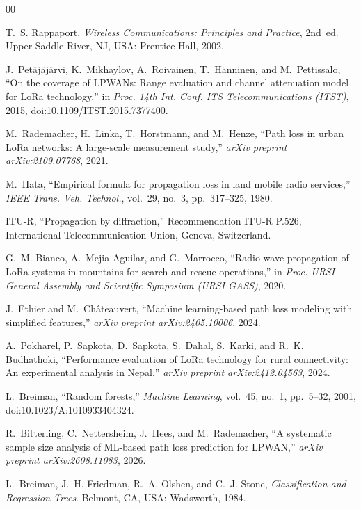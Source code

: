 \documentclass[conference]{IEEEtran}
\begin{document}
\begin{thebibliography}{00}

T.~S. Rappaport, \emph{Wireless Communications: Principles and Practice}, 2nd~ed. Upper Saddle River, NJ, USA: Prentice Hall, 2002.

J.~Petäjäjärvi, K.~Mikhaylov, A.~Roivainen, T.~Hänninen, and M.~Pettissalo, ``On the coverage of LPWANs: Range evaluation and channel attenuation model for LoRa technology,'' in \emph{Proc. 14th Int. Conf. ITS Telecommunications (ITST)}, 2015, doi:10.1109/ITST.2015.7377400.

M.~Rademacher, H.~Linka, T.~Horstmann, and M.~Henze, ``Path loss in urban LoRa networks: A large-scale measurement study,'' \emph{arXiv preprint arXiv:2109.07768}, 2021.

M.~Hata, ``Empirical formula for propagation loss in land mobile radio services,'' \emph{IEEE Trans. Veh. Technol.}, vol.~29, no.~3, pp.~317--325, 1980.

ITU-R, ``Propagation by diffraction,'' Recommendation ITU-R P.526, International Telecommunication Union, Geneva, Switzerland.

G.~M. Bianco, A.~Mejia-Aguilar, and G.~Marrocco, ``Radio wave propagation of LoRa systems in mountains for search and rescue operations,'' in \emph{Proc. URSI General Assembly and Scientific Symposium (URSI GASS)}, 2020.

J.~Ethier and M.~Châteauvert, ``Machine learning-based path loss modeling with simplified features,'' \emph{arXiv preprint arXiv:2405.10006}, 2024.

A.~Pokharel, P.~Sapkota, D.~Sapkota, S.~Dahal, S.~Karki, and R.~K. Budhathoki, ``Performance evaluation of LoRa technology for rural connectivity: An experimental analysis in Nepal,'' \emph{arXiv preprint arXiv:2412.04563}, 2024.

L.~Breiman, ``Random forests,'' \emph{Machine Learning}, vol.~45, no.~1, pp.~5--32, 2001, doi:10.1023/A:1010933404324.

R.~Bitterling, C.~Nettersheim, J.~Hees, and M.~Rademacher, ``A systematic sample size analysis of ML-based path loss prediction for LPWAN,'' \emph{arXiv preprint arXiv:2608.11083}, 2026.

L.~Breiman, J.~H. Friedman, R.~A. Olshen, and C.~J. Stone, \emph{Classification and Regression Trees}. Belmont, CA, USA: Wadsworth, 1984.


\end{thebibliography}
\end{document}
